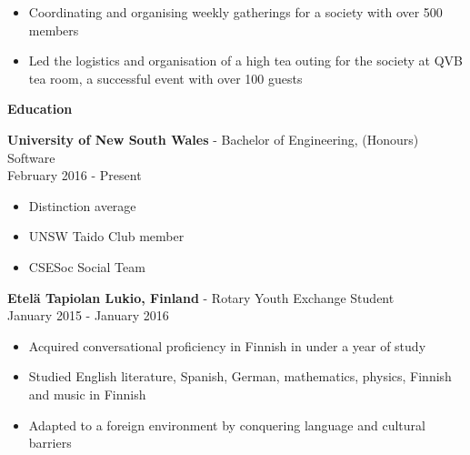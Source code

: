 \documentclass{article}
\newcommand{\minititle}[1]{\begin{center}\textbf{#1} \end{center} \vspace{0.2cm}}
\newcommand{\resumeEntry}[3]{{\large \textbf{#1} - #2} \\ \small{#3}}
\begin{document}
\begin{minipage}[t]{0.6\linewidth}
{\begin{itemize}
            \setlength\itemsep{0.05cm}
            \item Coordinating and organising weekly gatherings for a society with over 500 members 
            \item Led the logistics and organisation of a high tea outing for the society at QVB tea room, a successful event with over 100 guests
        \end{itemize}
    }
    {
        \vspace{0.1cm}
        \minititle{Education}
        \resumeEntry{University of New South Wales}{Bachelor of Engineering, (Honours) Software}{February 2016 - Present}
        \begin{itemize}
            \setlength\itemsep{0.05cm}
            \item Distinction average
            \item UNSW Taido Club member
            \item CSESoc Social Team
        \end{itemize}
        \vspace{0.4cm}
        \resumeEntry{Etel{\"a} Tapiolan Lukio, Finland}{Rotary Youth Exchange Student}{January 2015 - January 2016}
        \begin{itemize}
            \setlength\itemsep{0.05cm}
            \item Acquired conversational proficiency in Finnish in under a year of study
            \item Studied English literature, Spanish, German, mathematics, physics, Finnish and music in Finnish
            \item Adapted to a foreign environment by conquering language and cultural barriers

        \end{itemize}
    }
\end{minipage}\hspace{1cm}
\end{document}
